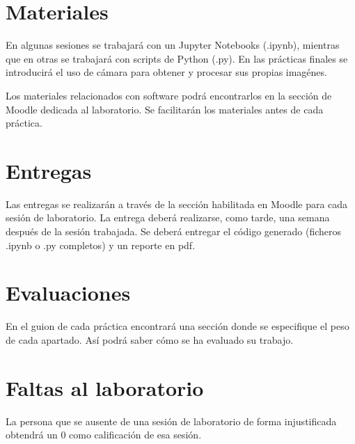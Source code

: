 \section{Materiales}
En algunas sesiones se trabajará con un Jupyter Notebooks (.ipynb), mientras que en otras se trabajará con scripts de Python (.py). En las prácticas finales se introducirá el uso de cámara para obtener y procesar sus propias imagénes.

Los materiales relacionados con software podrá encontrarlos en la sección de Moodle dedicada al laboratorio. Se facilitarán los materiales antes de cada práctica.

\section{Entregas}
Las entregas se realizarán a través de la sección habilitada en Moodle para cada sesión de laboratorio. La entrega deberá realizarse, como tarde, una semana después de la sesión trabajada. Se deberá entregar el código generado (ficheros .ipynb o .py completos) y un reporte en pdf.

\section{Evaluaciones}
En el guion de cada práctica encontrará una sección donde se especifique el peso de cada apartado. Así podrá saber cómo se ha evaluado su trabajo.

\section{Faltas al laboratorio}
La persona que se ausente de una sesión de laboratorio de forma injustificada obtendrá un 0 como calificación de esa sesión.